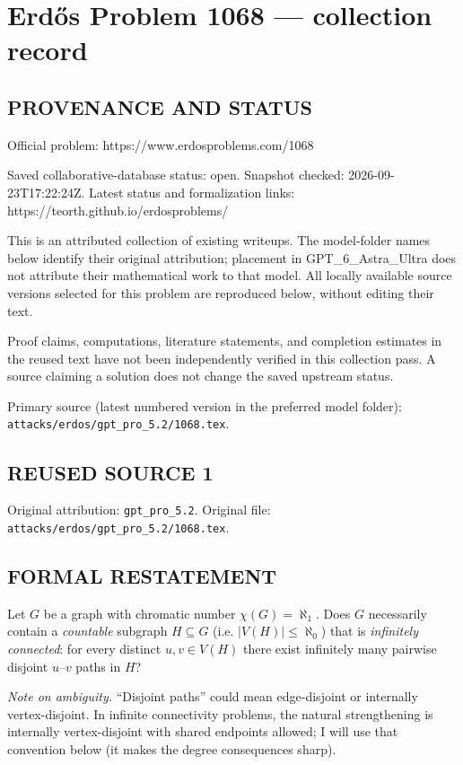 \section*{Erd\H{o}s Problem 1068 --- collection record}

\subsection*{PROVENANCE AND STATUS}
Official problem: https://www.erdosproblems.com/1068

Saved collaborative-database status: open.
Snapshot checked: 2026-09-23T17:22:24Z.
Latest status and formalization links: https://teorth.github.io/erdosproblems/

This is an attributed collection of existing writeups. The model-folder names below identify their original attribution; placement in GPT\_6\_Astra\_Ultra does not attribute their mathematical work to that model. All locally available source versions selected for this problem are reproduced below, without editing their text.

Proof claims, computations, literature statements, and completion estimates in the reused text have not been independently verified in this collection pass. A source claiming a solution does not change the saved upstream status.

Primary source (latest numbered version in the preferred model folder): \texttt{attacks/erdos/gpt\_pro\_5.2/1068.tex}.

\subsection*{REUSED SOURCE 1}
Original attribution: \texttt{gpt\_pro\_5.2}.
Original file: \texttt{attacks/erdos/gpt\_pro\_5.2/1068.tex}.


\subsection*{FORMAL RESTATEMENT}
Let $G$ be a graph with chromatic number $\chi(G)=\aleph_1$.
Does $G$ necessarily contain a \emph{countable} subgraph $H\subseteq G$ (i.e. $|V(H)|\le\aleph_0$) that is \emph{infinitely connected}:
for every distinct $u,v\in V(H)$ there exist infinitely many pairwise disjoint $u$--$v$ paths in $H$?

\emph{Note on ambiguity.} ``Disjoint paths'' could mean edge-disjoint or internally vertex-disjoint.  In infinite connectivity problems, the natural strengthening is internally vertex-disjoint with shared endpoints allowed; I will use that convention below (it makes the degree consequences sharp).

